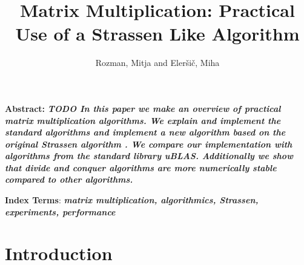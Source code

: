 \documentclass[a4paper,11pt]{article}
\title{Matrix Multiplication: Practical Use of a Strassen Like Algorithm}
\author{Rozman, Mitja and Eleršič, Miha}
\date{}
\renewenvironment{abstract}
{\begin{spacing}{1}\small\textbf{Abstract:}\bfseries\itshape}
{\end{spacing}}
\begin{document}
\maketitle



\begingroup
\renewcommand\thefootnote{}
\endgroup

\begin{abstract} %
TODO
In this paper we make an overview of practical matrix multiplication algorithms.
We explain and implement the standard algorithms and implement a new algorithm based on the original Strassen algorithm \cite{Strassen1969}.
We compare our implementation with algorithms from the standard library uBLAS. Additionally we show that divide and conquer algorithms are more numerically stable compared to other algorithms.
\end{abstract}
\vspace{0.5cm}
\begin{spacing}{0.9}
\small\textbf{Index Terms}:  \textbf{\textit {matrix multiplication, algorithmics, Strassen, experiments, performance}}
\end{spacing}


\section{Introduction}

\end{document}
